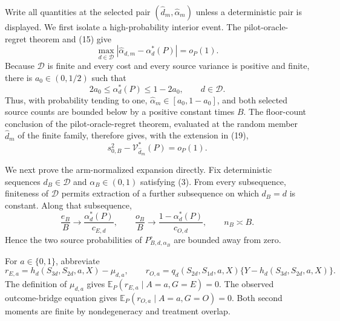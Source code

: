 Write all quantities at the selected pair \((\widehat d_m,\widehat\alpha_m)\) unless a deterministic pair is displayed.  We first isolate a high-probability interior event.  The pilot-oracle-regret theorem and (15) give
\[
 \max_{d\in\mathcal D}
 |\widehat\alpha_{d,m}-\alpha_d^*(P)|=o_P(1).                \tag{24}
\]
Because \(\mathcal D\) is finite and every cost and every source variance is positive and finite, there is \(a_0\in(0,1/2)\) such that
\[
 2a_0\le\alpha_d^*(P)\le1-2a_0,
 \qquad d\in\mathcal D.                                    \tag{25}
\]
Thus, with probability tending to one, \(\widehat\alpha_m\in[a_0,1-a_0]\), and both selected source counts are bounded below by a positive constant times \(B\).  The floor-count conclusion of the pilot-oracle-regret theorem, evaluated at the random member \(\widehat d_m\) of the finite family, therefore gives, with the extension in (19),
\[
 s_{0,B}^2-\mathcal V_{\widehat d_m}^*(P)=o_P(1).            \tag{26}
\]

We next prove the arm-normalized expansion directly.  Fix deterministic sequences \(d_B\in\mathcal D\) and \(\alpha_B\in(0,1)\) satisfying (3).  From every subsequence, finiteness of \(\mathcal D\) permits extraction of a further subsequence on which \(d_B=d\) is constant.  Along that subsequence,
\[
 \frac{e_B}{B}\longrightarrow\frac{\alpha_d^*(P)}{c_{E,d}},
 \qquad
 \frac{o_B}{B}\longrightarrow\frac{1-\alpha_d^*(P)}{c_{O,d}},
 \qquad n_B\asymp B.                                       \tag{27}
\]
Hence the two source probabilities of \(P_{B,d,\alpha_B}^{\circ}\) are bounded away from zero.

For \(a\in\{0,1\}\), abbreviate
\[
 r_{E,a}=h_d(S_{3d},S_{2d},a,X)-\mu_{d,a},
 \qquad
 r_{O,a}=q_d(S_{2d},S_{1d},a,X)
 \{Y-h_d(S_{3d},S_{2d},a,X)\}.                             \tag{28}
\]
The definition of \(\mu_{d,a}\) gives \(\mathbb E_P(r_{E,a}\mid A=a,G=E)=0\).  The observed outcome-bridge equation gives \(\mathbb E_P(r_{O,a}\mid A=a,G=O)=0\).  Both second moments are finite by nondegeneracy and treatment overlap.

